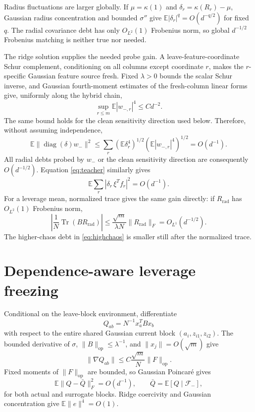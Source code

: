 \documentclass[11pt]{article}
\newcommand{\E}{\mathbb E}
\newcommand{\op}{\mathrm{op}}
\newcommand{\tr}{\operatorname{Tr}}
\begin{document}
Radius fluctuations are larger globally.  If \(\mu=\kappa(1)\) and \(\delta_r=\kappa(R_r)-\mu\), Gaussian radius concentration and bounded \(\sigma''\) give \(\E|\delta_r|^q=O(d^{-q/2})\) for fixed \(q\).  The radial covariance debt has only \(O_{L^2}(1)\) Frobenius norm, so global \(d^{-1/2}\) Frobenius matching is neither true nor needed.

The ridge solution supplies the needed probe gain.  A leave-feature-coordinate Schur complement, conditioning on all columns except coordinate \(r\), makes the \(r\)-specific Gaussian feature source fresh.  Fixed \(\lambda>0\) bounds the scalar Schur inverse, and Gaussian fourth-moment estimates of the fresh-column linear forms give, uniformly along the hybrid chain,
\begin{equation}\label{eq:coord4}
 \sup_{r\le m}\E|w_{-,r}|^4\le Cd^{-2}.
\end{equation}
The same bound holds for the clean sensitivity direction used below.  Therefore, without assuming independence,
\[
 \E\|\operatorname{diag}(\delta)w_-\|^2
 \le\sum_r(\E\delta_r^4)^{1/2}(\E|w_{-,r}|^4)^{1/2}=O(d^{-1}).
\]
All radial debts probed by \(w_-\) or the clean sensitivity direction are consequently \(O(d^{-1/2})\).  Equation \eqref{eq:teacher} similarly gives
\[
 \E\sum_r|\delta_r\,\xi^Tf_r|^2=O(d^{-1}).
\]
For a leverage mean, normalized trace gives the same gain directly: if \(R_{\mathrm{rad}}\) has \(O_{L^2}(1)\) Frobenius norm,
\begin{equation}\label{eq:normtrace}
 \left|\frac1N\tr(BR_{\mathrm{rad}})\right|
 \le\frac{\sqrt m}{\lambda N}\|R_{\mathrm{rad}}\|_F
 =O_{L^1}(d^{-1/2}).
\end{equation}
The higher-chaos debt in \eqref{eq:highchaos} is smaller still after the normalized trace.

\section{Dependence-aware leverage freezing}
Conditional on the leave-block environment, differentiate
\[
 Q_{ab}=N^{-1}x_a^TBx_b
\]
with respect to the entire shared Gaussian current block \((a_i,z_{i1},z_{i2})\).  The bounded derivative of \(\sigma\), \(\|B\|_{\op}\le\lambda^{-1}\), and \(\|x_j\|=O(\sqrt m)\) give
\[
 \|\nabla Q_{ab}\|\le C\frac{\sqrt m}{N}\|F\|_{\op}.
\]
Fixed moments of \(\|F\|_{\op}\) are bounded, so Gaussian Poincar\'e gives
\begin{equation}\label{eq:qfluct}
 \E\|Q-\bar Q\|_F^2=O(d^{-1}),\qquad \bar Q=\E[Q\mid\mathcal F_-],
\end{equation}
for both actual and surrogate blocks.  Ridge coercivity and Gaussian concentration give \(\E\|e\|^4=O(1)\).
\end{document}
